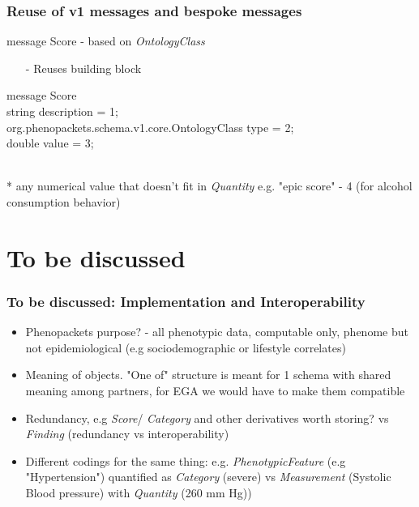 \documentclass{beamer}
\begin{document}

\begin{frame}
\frametitle{Reuse of v1 messages and bespoke messages}
\begin{block}{message Score - based on \textit{OntologyClass}}
\begin{itemize} 
\item[-] Reuses building block 
\end{itemize}
\end{block}
message \colorbox{yellow!80}{Score} \ { \\
    string description = 1; \\
    org.phenopackets.schema.v1.core.OntologyClass type = 2; \\
    double value = 3; \\
\ } \\

{\color{blue}* any numerical value that doesn't fit in \textit{Quantity} e.g. "epic score" - 4 (for alcohol consumption behavior)

}

\end{frame}

\section{To be discussed}

\begin{frame}
\frametitle{To be discussed: Implementation and Interoperability}
\begin{itemize}
\item Phenopackets purpose? - all phenotypic data, computable only, phenome but not epidemiological (e.g sociodemographic or lifestyle correlates)
\item Meaning of objects. "One of" structure is meant for 1 schema with shared meaning among partners, for EGA we would have to make them compatible
\item Redundancy, e.g \textit{Score}/ \textit{Category} and other derivatives worth storing? vs \textit{Finding} (redundancy vs interoperability)
\item Different codings for the same thing: e.g. \textit{PhenotypicFeature} (e.g "Hypertension") quantified as \textit{Category} (severe) vs \textit{Measurement} (Systolic Blood pressure) with \textit{Quantity} (260 mm Hg))

\end{itemize}
\end{frame}
\end{document}
